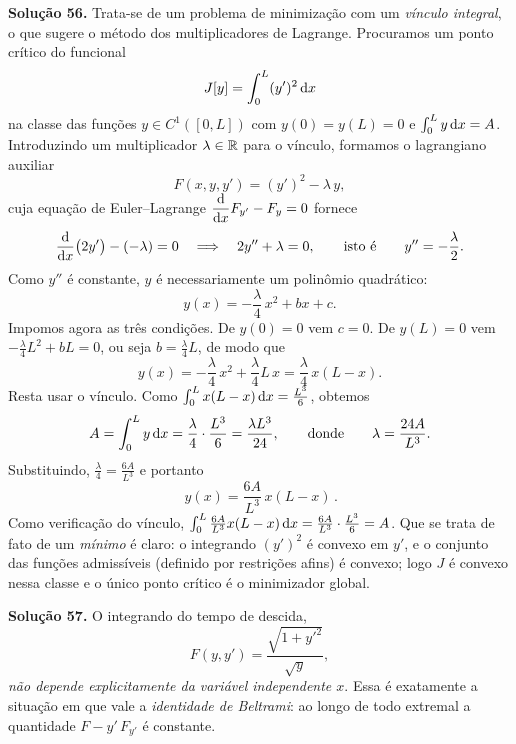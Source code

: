 \bigskip\noindent\textbf{Solução 56.}\quad
Trata-se de um problema de minimização com um \emph{vínculo integral}, o que
sugere o método dos multiplicadores de Lagrange. Procuramos um ponto crítico do
funcional
\[
    J[y]=\int_0^L (y')^2\,\mathrm{d} x
\]
na classe das funções $y\in C^1([0,L])$ com $y(0)=y(L)=0$ e
$\int_0^L y\,\mathrm{d} x=A$. Introduzindo um multiplicador $\lambda\in\mathbb{R}$ para o
vínculo, formamos o lagrangiano auxiliar
\[
    F(x,y,y')=(y')^2-\lambda\,y,
\]
cuja equação de Euler--Lagrange $\dfrac{\mathrm{d}}{\mathrm{d} x}F_{y'}-F_y=0$ fornece
\[
    \frac{\mathrm{d}}{\mathrm{d} x}\bigl(2y'\bigr)-(-\lambda)=0
    \quad\Longrightarrow\quad
    2y''+\lambda=0,
    \qquad\text{isto é}\qquad y''=-\frac{\lambda}{2}.
\]
Como $y''$ é constante, $y$ é necessariamente um polinômio quadrático:
\[
    y(x)=-\frac{\lambda}{4}\,x^2+bx+c .
\]
Impomos agora as três condições. De $y(0)=0$ vem $c=0$. De $y(L)=0$ vem
$-\frac{\lambda}{4}L^2+bL=0$, ou seja $b=\frac{\lambda}{4}L$, de modo que
\[
    y(x)=-\frac{\lambda}{4}\,x^2+\frac{\lambda}{4}L\,x
        =\frac{\lambda}{4}\,x(L-x).
\]
Resta usar o vínculo. Como $\int_0^L x(L-x)\,\mathrm{d} x=\frac{L^3}{6}$, obtemos
\[
    A=\int_0^L y\,\mathrm{d} x=\frac{\lambda}{4}\cdot\frac{L^3}{6}=\frac{\lambda L^3}{24},
    \qquad\text{donde}\qquad \lambda=\frac{24A}{L^3}.
\]
Substituindo, $\frac{\lambda}{4}=\frac{6A}{L^3}$ e portanto
\[
    \boxed{\,y(x)=\frac{6A}{L^3}\,x(L-x)\,}.
\]
Como verificação do vínculo,
$\int_0^L \frac{6A}{L^3}x(L-x)\,\mathrm{d} x=\frac{6A}{L^3}\cdot\frac{L^3}{6}=A$.
Que se trata de fato de um \emph{mínimo} é claro: o integrando $(y')^2$ é convexo
em $y'$, e o conjunto das funções admissíveis (definido por restrições afins) é
convexo; logo $J$ é convexo nessa classe e o único ponto crítico é o minimizador
global.

\bigskip\noindent\textbf{Solução 57.}\quad
O integrando do tempo de descida,
\[
    F(y,y')=\frac{\sqrt{1+y'^2}}{\sqrt{y}},
\]
\emph{não depende explicitamente da variável independente $x$}. Essa é
exatamente a situação em que vale a \emph{identidade de Beltrami}: ao longo de
todo extremal a quantidade $F-y'\,F_{y'}$ é constante.

